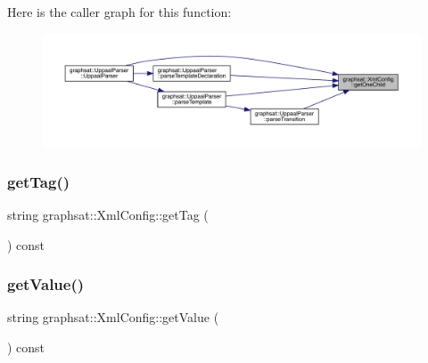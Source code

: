 Here is the caller graph for this function\+:
\nopagebreak
\begin{figure}[H]
\begin{center}
\leavevmode
\includegraphics[width=350pt]{classgraphsat_1_1_xml_config_afcc69a80121ee6d026c5da49defb566b_icgraph}
\end{center}
\end{figure}
\mbox{\label{classgraphsat_1_1_xml_config_ad73db8940c92561b9ed0dc3758686f7b}} 
\subsubsection{\texorpdfstring{getTag()}{getTag()}}
{\footnotesize\ttfamily string graphsat\+::\+Xml\+Config\+::get\+Tag (\begin{DoxyParamCaption}{ }\end{DoxyParamCaption}) const\hspace{0.3cm}{\ttfamily [inline]}}

\mbox{\label{classgraphsat_1_1_xml_config_ae8f15789e71f2bb0f795b832b107698f}} 
\subsubsection{\texorpdfstring{getValue()}{getValue()}}
{\footnotesize\ttfamily string graphsat\+::\+Xml\+Config\+::get\+Value (\begin{DoxyParamCaption}{ }\end{DoxyParamCaption}) const\hspace{0.3cm}{\ttfamily [inline]}}

